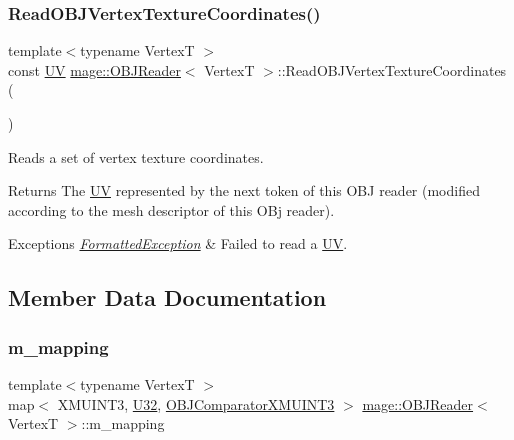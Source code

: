 \subsubsection{\texorpdfstring{Read\+O\+B\+J\+Vertex\+Texture\+Coordinates()}{ReadOBJVertexTextureCoordinates()}}
{\footnotesize\ttfamily template$<$typename VertexT $>$ \\
const \hyperlink{structmage_1_1_u_v}{UV} \hyperlink{classmage_1_1_o_b_j_reader}{mage\+::\+O\+B\+J\+Reader}$<$ VertexT $>$\+::Read\+O\+B\+J\+Vertex\+Texture\+Coordinates (\begin{DoxyParamCaption}{ }\end{DoxyParamCaption})\hspace{0.3cm}{\ttfamily [private]}}

Reads a set of vertex texture coordinates.

\begin{DoxyReturn}{Returns}
The {\ttfamily \hyperlink{structmage_1_1_u_v}{UV}} represented by the next token of this O\+BJ reader (modified according to the mesh descriptor of this O\+Bj reader). 
\end{DoxyReturn}

\begin{DoxyExceptions}{Exceptions}
{\em \hyperlink{classmage_1_1_formatted_exception}{Formatted\+Exception}} & Failed to read a {\ttfamily \hyperlink{structmage_1_1_u_v}{UV}}. \\
\hline
\end{DoxyExceptions}


\subsection{Member Data Documentation}
\hypertarget{classmage_1_1_o_b_j_reader_a6707a903835506be468fa6a0af29a70b}{}\label{classmage_1_1_o_b_j_reader_a6707a903835506be468fa6a0af29a70b} 
\subsubsection{\texorpdfstring{m\+\_\+mapping}{m\_mapping}}
{\footnotesize\ttfamily template$<$typename VertexT $>$ \\
map$<$ X\+M\+U\+I\+N\+T3, \hyperlink{namespacemage_a41c104c036fba3756a74e19f793eeaa1}{U32}, \hyperlink{structmage_1_1_o_b_j_reader_1_1_o_b_j_comparator_x_m_u_i_n_t3}{O\+B\+J\+Comparator\+X\+M\+U\+I\+N\+T3} $>$ \hyperlink{classmage_1_1_o_b_j_reader}{mage\+::\+O\+B\+J\+Reader}$<$ VertexT $>$\+::m\+\_\+mapping\hspace{0.3cm}{\ttfamily [private]}}

